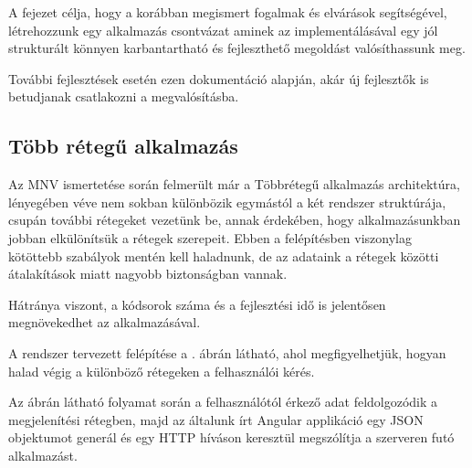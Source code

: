 
A fejezet célja, hogy a korábban megismert fogalmak és elvárások segítségével, létrehozzunk egy alkalmazás csontvázat aminek az implementálásával egy jól strukturált könnyen karbantartható és fejleszthető megoldást valósíthassunk meg.

További fejlesztések esetén ezen dokumentáció alapján, akár új fejlesztők is betudjanak csatlakozni a megvalósításba.  


\subsection{Több rétegű alkalmazás}
Az MNV ismertetése során felmerült már a Többrétegű alkalmazás architektúra, lényegében véve nem sokban különbözik egymástól a két rendszer struktúrája, csupán további rétegeket vezetünk be, annak érdekében, hogy alkalmazásunkban jobban elkülönítsük a rétegek szerepeit. Ebben a felépítésben viszonylag kötöttebb szabályok mentén kell haladnunk, de az adataink a rétegek közötti átalakítások miatt nagyobb biztonságban vannak.

Hátránya viszont, a kódsorok száma és a fejlesztési idő is jelentősen megnövekedhet az alkalmazásával.

A rendszer tervezett felépítése a . ábrán látható, ahol megfigyelhetjük, hogyan halad végig a különböző rétegeken a felhasználói kérés. 

\vskip 0.2in
Az ábrán látható folyamat során a felhasználótól érkező adat feldolgozódik a megjelenítési rétegben, majd az általunk írt Angular applikáció egy JSON objektumot generál és egy HTTP híváson keresztül megszólítja a szerveren futó alkalmazást. 

